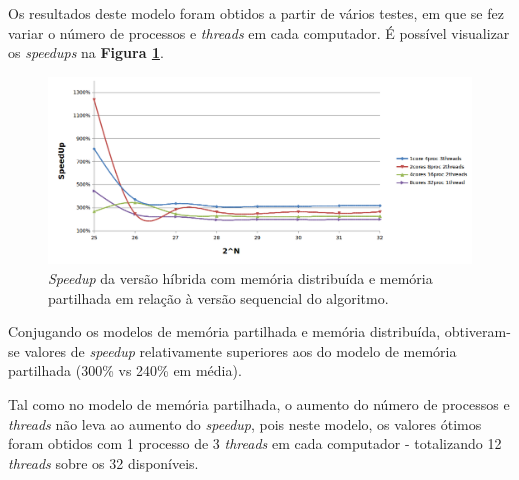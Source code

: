 \documentclass[a4paper]{article}
\begin{document}
Os resultados deste modelo foram obtidos a partir de vários testes, em que se fez variar o número de processos e \textit{threads} em cada computador. É possível visualizar os \textit{speedups} na \textbf{Figura \ref{fig:MPI&OMP}}.

\begin{figure}[h]
    \centering
    \hspace*{-0.8in}
    \includegraphics[width=1.3\textwidth]{openMPIOMPSpeedup.png}
    \caption{\textit{Speedup} da versão híbrida com memória distribuída e memória partilhada em relação à versão sequencial do algoritmo.}
    \label{fig:MPI&OMP}
\end{figure}

\pagebreak

Conjugando os modelos de memória partilhada e memória distribuída, obtiveram-se valores de \textit{speedup} relativamente superiores aos do modelo de memória partilhada (300\% vs 240\% em média).

Tal como no modelo de memória partilhada, o aumento do número de processos e \textit{threads} não leva ao aumento do \textit{speedup}, pois neste modelo, os valores ótimos foram obtidos com 1 processo de 3 \textit{threads} em cada computador - totalizando 12 \textit{threads} sobre os 32 disponíveis.
\end{document}
